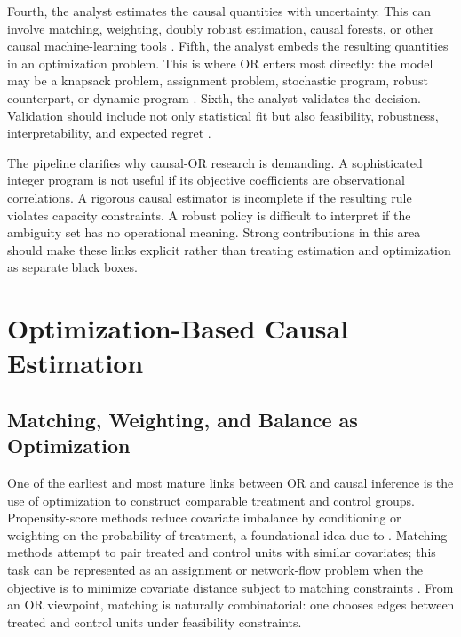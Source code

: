 \documentclass[11pt]{article}
\begin{document}
Fourth, the analyst estimates the causal quantities with uncertainty. This can involve matching, weighting, doubly robust estimation, causal forests, or other causal machine-learning tools \citep{hainmueller2012entropy,chernozhukov2018dml,wager2018causalforest,athey2019grf}. Fifth, the analyst embeds the resulting quantities in an optimization problem. This is where OR enters most directly: the model may be a knapsack problem, assignment problem, stochastic program, robust counterpart, or dynamic program \citep{bertsimas1997introduction,ben2009robust,iyengar2005robust}. Sixth, the analyst validates the decision. Validation should include not only statistical fit but also feasibility, robustness, interpretability, and expected regret \citep{kitagawa2018treated,fernandez2022causal,athey2021policy}.

The pipeline clarifies why causal-OR research is demanding. A sophisticated integer program is not useful if its objective coefficients are observational correlations. A rigorous causal estimator is incomplete if the resulting rule violates capacity constraints. A robust policy is difficult to interpret if the ambiguity set has no operational meaning. Strong contributions in this area should make these links explicit rather than treating estimation and optimization as separate black boxes.

\section{Optimization-Based Causal Estimation}
\label{sec:estimation}

\subsection{Matching, Weighting, and Balance as Optimization}

One of the earliest and most mature links between OR and causal inference is the use of optimization to construct comparable treatment and control groups. Propensity-score methods reduce covariate imbalance by conditioning or weighting on the probability of treatment, a foundational idea due to \citet{rosenbaum1983central}. Matching methods attempt to pair treated and control units with similar covariates; this task can be represented as an assignment or network-flow problem when the objective is to minimize covariate distance subject to matching constraints \citep{cousineau2023optimization}. From an OR viewpoint, matching is naturally combinatorial: one chooses edges between treated and control units under feasibility constraints.
\end{document}
